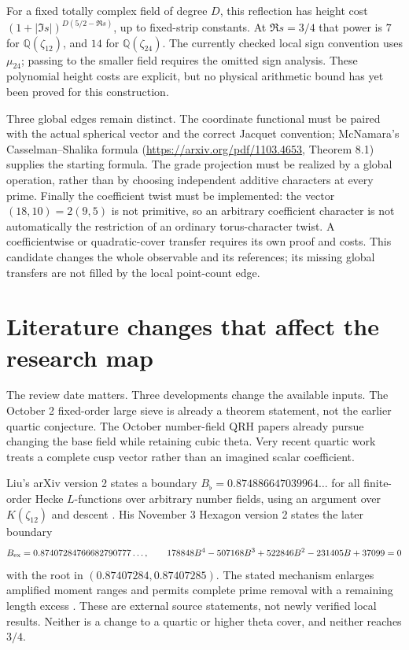 \documentclass[11pt]{article}
\begin{document}
For a fixed totally complex field of degree \(D\), this reflection
has height cost
\((1+|\Im s|)^{D(5/2-\Re s)}\), up to fixed-strip constants.
At \(\Re s=3/4\) that power is \(7\) for
\(\mathbb Q(\zeta_{12})\), and \(14\) for
\(\mathbb Q(\zeta_{24})\). The currently checked local sign convention
uses \(\mu_{24}\); passing to the smaller field requires the omitted
sign analysis. These polynomial height costs are explicit, but no
physical arithmetic bound has yet been proved for this construction.

Three global edges remain distinct. The coordinate functional must
be paired with the actual spherical vector and the correct Jacquet
convention; McNamara's Casselman--Shalika formula
(\url{https://arxiv.org/pdf/1103.4653}, Theorem 8.1) supplies the
starting formula. The grade projection must be realized by a global
operation, rather than by choosing independent additive characters
at every prime. Finally the coefficient twist must be implemented:
the vector \((18,10)=2(9,5)\) is not primitive, so an arbitrary
coefficient character is not automatically the restriction of an
ordinary torus-character twist. A coefficientwise or quadratic-cover
transfer requires its own proof and costs. This candidate changes
the whole observable and its references; its missing global
transfers are not filled by the local point-count edge.


\section{Literature changes that affect the research map}

The review date matters. Three developments change the available inputs.
The October 2 fixed-order large sieve is already a theorem statement,
not the earlier quartic conjecture. The October number-field QRH papers
already pursue changing the base field while retaining cubic theta.
Very recent quartic work treats a complete cusp vector rather than an
imagined scalar coefficient.

Liu's arXiv version 2 states a boundary
$B_\flat=0.874886647039964\ldots$ for all finite-order Hecke
$L$-functions over arbitrary number fields, using an argument over
$K(\zeta_{12})$ and descent \cite{LiuField}. His November 3 Hexagon
version 2 states the later boundary
\[
 B_{\rm ex}=0.87407284766682790777\ldots,\qquad
 178848B^4-507168B^3+522846B^2-231405B+37099=0
\]
with the root in $(0.87407284,0.87407285)$.
The stated mechanism enlarges amplified moment ranges and permits
complete prime removal with a remaining length excess
\cite{LiuLatest}. These are external source statements, not newly
verified local results. Neither is a change to a quartic or higher theta
cover, and neither reaches $3/4$.
\end{document}
